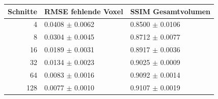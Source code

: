 \begin{tabular}{rll}
\toprule
Schnitte & RMSE fehlende Voxel & SSIM Gesamtvolumen \\
\midrule
4 & 0.0408 $\pm$ 0.0062 & 0.8500 $\pm$ 0.0106 \\
8 & 0.0304 $\pm$ 0.0045 & 0.8712 $\pm$ 0.0077 \\
16 & 0.0189 $\pm$ 0.0031 & 0.8917 $\pm$ 0.0036 \\
32 & 0.0134 $\pm$ 0.0023 & 0.9025 $\pm$ 0.0009 \\
64 & 0.0083 $\pm$ 0.0016 & 0.9092 $\pm$ 0.0014 \\
128 & 0.0077 $\pm$ 0.0010 & 0.9107 $\pm$ 0.0019 \\
\bottomrule
\end{tabular}
